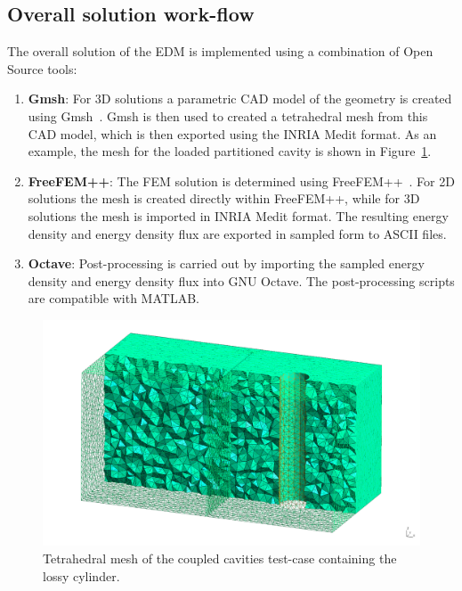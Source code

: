 \documentclass[a4paper]{article}
\numberwithin{equation}{section}
\newcounter{Figure}
\begin{document}
\subsection[Overall solution work-flow]{Overall solution work-flow}
\label{sc:tcs:workflow}

The overall solution of the EDM is implemented using a combination of Open Source tools: 
\begin{enumerate}
 \item \textbf{Gmsh}: For 3D solutions a parametric CAD model of the geometry is created using 
 Gmsh~\citep{Geuzaine2009}. Gmsh is then used to created a tetrahedral mesh from this CAD model, which 
 is then exported using the INRIA Medit format. As an example, the mesh for the loaded partitioned cavity
 is shown in Figure~\ref{fg:tcdualmesh}.
 \item \textbf{FreeFEM++}: The FEM solution is determined using FreeFEM++~\citep{Hecht2013}. For 2D
 solutions the mesh is created directly within FreeFEM++, while for 3D solutions the mesh is imported in INRIA
 Medit format. The resulting energy density and energy density flux are exported in sampled form to ASCII files. 
 \item \textbf{Octave}: Post-processing is carried out by importing the sampled energy density and energy density 
 flux into GNU Octave. The post-processing scripts are compatible with MATLAB.
\end{enumerate}

\begin{figure}[ht]
\begin{center}
\includegraphics[width=0.8\linewidth]{figures/gmshdualmesh}
\vspace{-4mm}
\caption{\label{fg:tcdualmesh} Tetrahedral mesh of the coupled cavities test-case containing the lossy cylinder.}
\end{center}
\end{figure}
\end{document}
